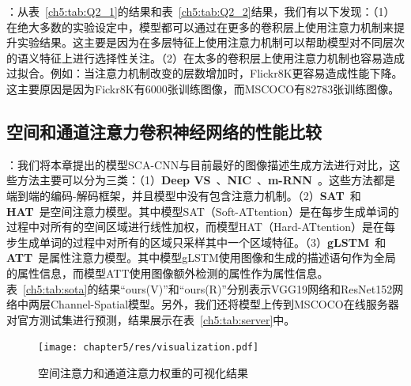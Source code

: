 \textbf{}：从表~\ref{ch5:tab:Q2_1}的结果和表~\ref{ch5:tab:Q2_2}结果，我们有以下发现：（1）在绝大多数的实验设定中，模型都可以通过在更多的卷积层上使用注意力机制来提升实验结果。这主要是因为在多层特征上使用注意力机制可以帮助模型对不同层次的语义特征上进行选择性关注。（2）在太多的卷积层上使用注意力机制也容易造成过拟合。例如：当注意力机制改变的层数增加时，Flickr8K更容易造成性能下降。这主要原因是因为Fickr8K有6000张训练图像，而MSCOCO有82783张训练图像。


\subsection{空间和通道注意力卷积神经网络的性能比较}

\textbf{}：我们将本章提出的模型SCA-CNN与目前最好的图像描述生成方法进行对比，这些方法主要可以分为三类：（1）\textbf{Deep VS}~\cite{karpathy2015deep}、\textbf{NIC}~\cite{vinyals2015show}、\textbf{m-RNN}~\cite{mao2015deep}。这些方法都是端到端的编码-解码框架，并且模型中没有包含注意力机制。（2）\textbf{SAT}~\cite{xu2015show}和\textbf{HAT}~\cite{xu2015show}是空间注意力模型。其中模型SAT（Soft-ATtention）是在每步生成单词的过程中对所有的空间区域进行线性加权，而模型HAT（Hard-ATtention）是在每步生成单词的过程中对所有的区域只采样其中一个区域特征。（3）\textbf{gLSTM}~\cite{jia2015guiding}和\textbf{ATT}~\cite{you2016image}是属性注意力模型。其中模型gLSTM使用图像和生成的描述语句作为全局的属性信息，而模型ATT使用图像额外检测的属性作为属性信息。表~\ref{ch5:tab:sota}的结果“ours(V)”和“ours(R)”分别表示VGG19网络和ResNet152网络中两层Channel-Spatial模型。另外，我们还将模型上传到MSCOCO在线服务器对官方测试集进行预测，结果展示在表~\ref{ch5:tab:server}中。

\begin{figure}[t]
    \centering
    \texttt{[image: chapter5/res/visualization.pdf]}
    \caption{空间注意力和通道注意力权重的可视化结果}
    \label{ch5:fig:visualization}
\end{figure}

